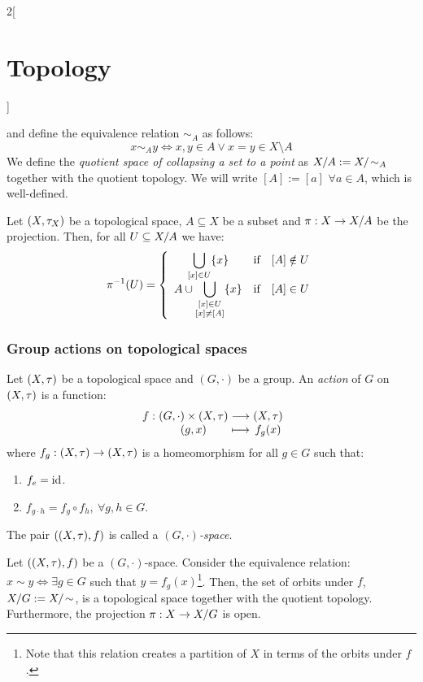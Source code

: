 \documentclass[../../../main.tex]{subfiles}
\begin{document}
\begin{multicols}{2}[\section{Topology}]
\begin{definition}
        and define the equivalence relation $\sim_A$ as follows: $$x\sim_A y\iff x,y\in A\lor x=y\in X\setminus A$$
        We define the \emph{quotient space of collapsing a set to a point} as $\quot{X}{A}:=\quot{X}{\!\sim_A}$ together with the quotient topology. We will write $[A]:=[a]$ $\forall a\in A$, which is well-defined.
    \end{definition}
    \begin{prop}
        Let $(X,\tau_X)$ be a topological space, $A\subseteq X$ be a subset and $\pi:X\rightarrow\quot{X}{A}$ be the projection. Then, for all $U\subseteq\quot{X}{A}$ we have:
        $$
            \pi^{-1}(U)=\left\{\begin{array}{ccc}
                \displaystyle\bigcup_{[x]\in U}\{x\} & \text{if} & [A]\notin U \\
                \displaystyle A\cup \bigcup_{
                    \begin{subarray}{c}
                        [x]\in U \\
                        [x]\ne [A]
                    \end{subarray}
                }\{x\}                               & \text{if} & [A]\in U
            \end{array}\right.
        $$
    \end{prop}
    \subsubsection{Group actions on topological spaces}
    \begin{definition}
        Let $(X,\tau)$ be a topological space and $(G,\cdot)$ be a group. An \emph{action} of $G$ on $(X,\tau)$ is a function:
        $$\function{f}{(G,\cdot)\times(X,\topo)}{(X,\topo)}{(g,x)}{f_g(x)}$$ where $f_g:(X,\tau)\rightarrow(X,\tau)$ is a homeomorphism for all $g\in G$ such that:
        \begin{enumerate}
            \item $f_e=\mathrm{id}$.
            \item $f_{g\cdot h}=f_g\circ f_h,\ \forall g,h\in G$.
        \end{enumerate}
        The pair $((X,\tau),f)$ is called a \emph{$(G,\cdot)$-space}.
    \end{definition}
    \begin{prop}
        Let $((X,\tau),f)$ be a $(G,\cdot)$-space. Consider the equivalence relation: $x\sim y\iff\exists g\in G$ such that $y=f_g(x)$\footnote{Note that this relation creates a partition of $X$ in terms of the orbits under $f$.}. Then, the set of orbits under $f$, $\quot{X}{G}:=\quot{X}{\!\sim}$, is a topological space together with the quotient topology. Furthermore, the projection $\pi:X\rightarrow\quot{X}{G}$ is open.
    \end{prop}

\end{multicols}
\end{document}
